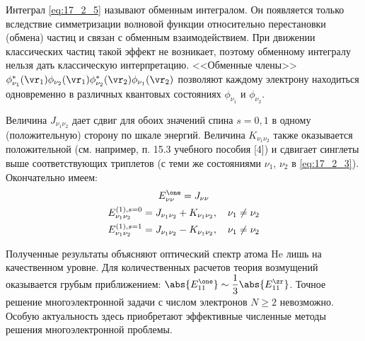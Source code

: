 Интеграл \eqref{eq:17_2_5} называют обменным интегралом. Он появляется только вследствие симметризации волновой функции относительно перестановки (обмена) частиц и связан с обменным взаимодействием. При движении классических частиц такой эффект не возникает, поэтому обменному интегралу нельзя дать классическую интерпретацию. <<Обменные члены>> $\phi^*_{\nu_1}(\vr_1) \phi_{\nu_2}(\vr_1) \phi^*_{\nu_2}(\vr_2) \phi_{\nu_1}(\vr_2)$ позволяют каждому электрону находиться одновременно в различных квантовых состояниях $\phi_{\nu_1}$ и $\phi_{\nu_2}$.

Величина $J_{\nu_1 \nu_2}$ дает сдвиг для обоих значений спина $s = 0, 1$ в одному (положительную) сторону по шкале энергий. Величина $K_{\nu_1 \nu_2}$ также оказывается положительной (см. например, п. 15.3 учебного пособия [4]) и сдвигает синглеты выше соответствующих триплетов (с теми же состояниями $\nu_1$, $\nu_2$ в \eqref{eq:17_2_3}). Окончательно имеем:
\begin{gather}
\label{eq:17_2_6}
E_{\nu\nu}^\one = J_{\nu\nu} \\
E_{\nu_1 \nu_2}^{(1), s=0} = J_{\nu_1\nu_2} + K_{\nu_1\nu_2},~~~\nu_1 \neq \nu_2 \\
E_{\nu_1 \nu_2}^{(1), s=1} = J_{\nu_1\nu_2} - K_{\nu_1\nu_2},~~~\nu_1 \neq \nu_2
\end{gather}

Полученные результаты объясняют оптический спектр атома He лишь на качественном уровне. Для количественных расчетов теория возмущений оказывается грубым приближением: $\abs{E_{11}^\one} \sim \dfrac{1}{3} \abs{E_{11}^\zr}$. Точное решение многоэлектронной задачи с числом электронов $N \ge 2$ невозможно. Особую актуальность здесь приобретают эффективные численные методы решения многоэлектронной проблемы.
